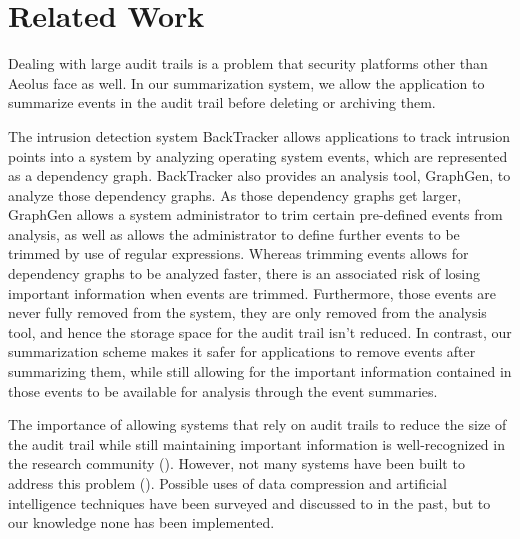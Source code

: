 \chapter{Related Work}

Dealing with large audit trails is a problem that security platforms other than Aeolus face as well. In our summarization system, we allow the application to summarize events in the audit trail before deleting or archiving them.

The intrusion detection system BackTracker \cite{backtracker} allows applications to track intrusion points into a system by analyzing operating system events, which are represented as a dependency graph. BackTracker also provides an analysis tool, GraphGen, to analyze those dependency graphs. As those dependency graphs get larger, GraphGen allows a system administrator to trim certain pre-defined events from analysis, as well as allows the administrator to define further events to be trimmed by use of regular expressions. Whereas trimming events allows for dependency graphs to be analyzed faster, there is an associated risk of losing important information when events are trimmed. Furthermore, those events are never fully removed from the system, they are only removed from the analysis tool, and hence the storage space for the audit trail isn't reduced. In contrast, our summarization scheme makes it safer for applications to remove events after summarizing them, while still allowing for the important information contained in those events to be available for analysis through the event summaries.

The importance of allowing systems that rely on audit trails to reduce the size of the audit trail while still maintaining important information is well-recognized in the research community (\cite{at-red, intro-nist, Lunt1993405}). However, not many systems have been built to address this problem (\cite{ids}). Possible uses of data compression \cite{ids} and artificial intelligence \cite{ai} techniques have been surveyed and discussed to in the past, but to our knowledge none has been implemented.
